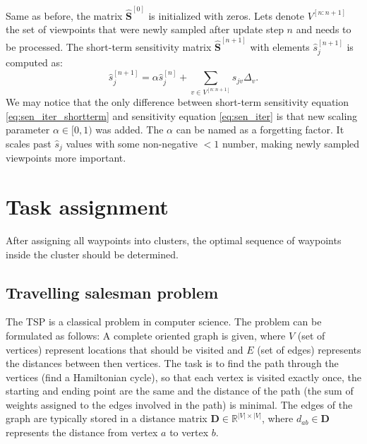Same as before, the matrix $\mathbf{\hat{S}}^{[0]}$ is initialized with zeros.
Lets denote $V^{[n:n+1]}$ the set of viewpoints that were newly sampled after update step $n$ and needs to be processed. 
The short-term sensitivity matrix $\mathbf{\hat{S}}^{[n+1]}$ with elements $\hat{s}_{j}^{[n+1]}$ is computed as:
\begin{equation}
  \hat{s}_{j}^{[n+1]} = \alpha \hat{s}_{j}^{[n]} + \sum_{v \in V^{[n:n+1]}} s_{jv} \Delta_{v}. 
  \label{eq:sen_iter_shortterm}
\end{equation}
We may notice that the only difference between short-term sensitivity equation \ref{eq:sen_iter_shortterm} and sensitivity equation \ref{eq:sen_iter} is that new scaling parameter $\alpha \in [0, 1)$ was added.
The $\alpha$ can be named as a forgetting factor.
It scales past $\hat{s}_{j}$ values with some non-negative $<1$ number, making newly sampled viewpoints more important.








\section{Task assignment}

After assigning all waypoints into clusters, the optimal sequence of waypoints inside the cluster should be determined.

\subsection{Travelling salesman problem}
The \ac{TSP} is a classical problem in computer science. 
The problem can be formulated as follows: 
A complete oriented graph is given, where $V$ (set of vertices) represent locations that should be visited and $E$ (set of edges) represents the distances between then vertices.
The task is to find the path through the vertices (find a Hamiltonian cycle), so that each vertex is visited exactly once, the starting and ending point are the same and the distance of the path (the sum of weights assigned to the edges involved in the path) is minimal.
The edges of the graph are typically stored in a distance matrix $\mathbf{D}\in \mathbb{R}^{\left|V\right|\times\left|V\right|}$, where $d_{ab} \in \mathbf{D}$ represents the distance from vertex $a$ to vertex $b$.

